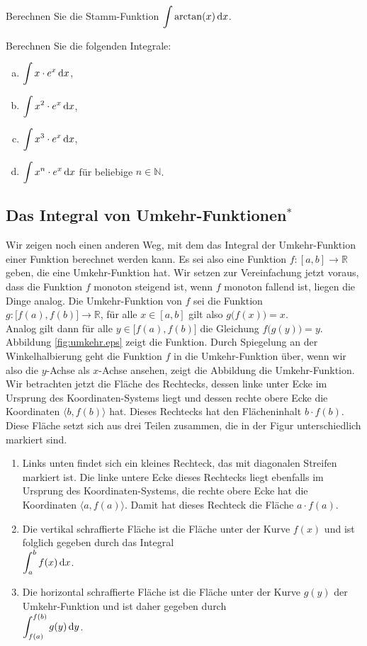 \exercise
Berechnen Sie die Stamm-Funktion $\displaystyle\int \arctan(x)\,\textrm{d} x$.  \eox

\exercise
Berechnen Sie die folgenden Integrale:
\begin{enumerate}[(a)]
\item $\displaystyle \int x \cdot e^x\,\textrm{d} x$,
\item $\displaystyle \int x^2 \cdot e^x\,\textrm{d} x$,
\item $\displaystyle \int x^3 \cdot e^x\,\textrm{d} x$,
\item $\displaystyle \int x^n \cdot e^x\,\textrm{d} x$ \quad f\"ur beliebige $n \in \mathbb{N}$.
\end{enumerate}

\subsection{Das Integral von Umkehr-Funktionen$^*$}
Wir zeigen noch einen anderen Weg, mit dem das Integral der Umkehr-Funktion einer Funktion
berechnet werden kann.  Es sei also eine Funktion $f:[a,b] \rightarrow\mathbb{R}$ geben,
die eine Umkehr-Funktion hat.  Wir setzen zur Vereinfachung jetzt voraus, dass die
Funktion $f$ monoton steigend ist, wenn $f$ monoton fallend ist, liegen die Dinge analog.
Die Umkehr-Funktion von $f$ sei die Funktion
\\[0.2cm]
\hspace*{1.3cm}
 $g:\bigl[f(a), f(b)\bigl]
\rightarrow\mathbb{R}$, \quad f\"ur alle $x\in[a,b]$ gilt also $g\bigl(f(x)\bigr) = x$.  
\\[0.2cm]
Analog gilt dann f\"ur alle $y\in\bigl[f(a),f(b)\bigr]$ die Gleichung
$f\bigl(g(y)\bigr) = y$. Abbildung \ref{fig:umkehr.eps} zeigt die Funktion.  Durch
Spiegelung an der Winkelhalbierung geht die Funktion $f$ in die Umkehr-Funktion \"uber,
wenn wir also die $y$-Achse als $x$-Achse ansehen, zeigt die Abbildung die Umkehr-Funktion.
Wir betrachten jetzt die Fl\"ache des Rechtecks, dessen linke unter Ecke
im Ursprung des Koordinaten-Systems liegt und dessen rechte obere Ecke die Koordinaten
$\bigl\langle b,f(b)\bigr\rangle$ hat.  Dieses Rechtecks hat den Fl\"acheninhalt $b\cdot f(b)$.
Diese Fl\"ache setzt sich aus drei Teilen zusammen, die in der Figur unterschiedlich markiert
sind.
\begin{enumerate}
\item Links unten findet sich ein kleines Rechteck, das mit diagonalen Streifen markiert
      ist.  Die linke untere Ecke dieses Rechtecks liegt ebenfalls im Ursprung des
      Koordinaten-Systems, die rechte obere Ecke hat die Koordinaten $\bigl\langle a,f(a)\bigr\rangle$.
      Damit hat dieses Rechteck die Fl\"ache $a\cdot f(a)$.
\item Die vertikal schraffierte Fl\"ache ist die Fl\"ache unter der Kurve $f(x)$ und ist
      folglich gegeben durch das Integral
      \\[0.2cm]
      \hspace*{1.3cm} $\displaystyle \int_a^b f(x)\, \textrm{d} x$.
\item Die horizontal schraffierte Fl\"ache ist die Fl\"ache unter der Kurve $g(y)$ der
      Umkehr-Funktion   und ist daher gegeben durch 
      \\[0.2cm]
      \hspace*{1.3cm} $\displaystyle \int_{f(a)}^{f(b)} g(y)\, \textrm{d} y$.
\end{enumerate}
